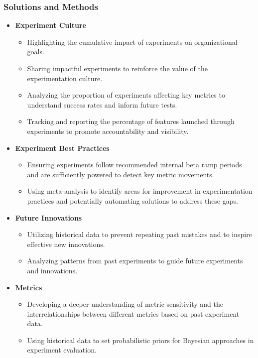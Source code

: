 \documentclass{article}
\begin{document}
\subsubsection*{Solutions and Methods}
\begin{itemize}
    \item \textbf{Experiment Culture}
    \begin{itemize}
        \item Highlighting the cumulative impact of experiments on organizational goals.
        \item Sharing impactful experiments to reinforce the value of the experimentation culture.
        \item Analyzing the proportion of experiments affecting key metrics to understand success rates and inform future tests.
        \item Tracking and reporting the percentage of features launched through experiments to promote accountability and visibility.
    \end{itemize}

    \item \textbf{Experiment Best Practices}
    \begin{itemize}
        \item Ensuring experiments follow recommended internal beta ramp periods and are sufficiently powered to detect key metric movements.
        \item Using meta-analysis to identify areas for improvement in experimentation practices and potentially automating solutions to address these gaps.
    \end{itemize}

    \item \textbf{Future Innovations}
    \begin{itemize}
        \item Utilizing historical data to prevent repeating past mistakes and to inspire effective new innovations.
        \item Analyzing patterns from past experiments to guide future experiments and innovations.
    \end{itemize}

    \item \textbf{Metrics}
    \begin{itemize}
        \item Developing a deeper understanding of metric sensitivity and the interrelationships between different metrics based on past experiment data.
        \item Using historical data to set probabilistic priors for Bayesian approaches in experiment evaluation.
    \end{itemize}


\end{itemize}
\end{document}
